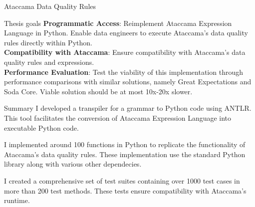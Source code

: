 \documentclass[portrait,a0paper,fontscale=0.25]{baposter}
\begin{document}
\begin{poster}
\begin{posterbox}[column=0, name=ata, below=background]{Ataccama Data Quality Rules}
	\end{posterbox}
	

\begin{posterbox}[column=0, name=goals, below=ata, headerColorOne=cyan!60, boxColorOne=cyan!20]{Thesis goals}
 \textbf{Programmatic Access}: Reimplement Ataccama Expression Language in Python. Enable data engineers to execute Ataccama’s data quality rules directly within Python. \\

 \textbf{Compatibility with Ataccama}: Ensure compatibility with Ataccama’s data quality rules and expressions. \\

 \textbf{Performance Evaluation}: Test the viability of this implementation through performance comparisons with similar solutions, namely Great Expectations and Soda Core. Viable solution should be at most 10x-20x slower. \\

\end{posterbox}


\begin{posterbox}[column=0, name=summary, below=goals]{Summary}
	I developed a transpiler for a grammar to Python code using ANTLR. This tool facilitates the conversion of Ataccama Expression Language into executable Python code.

	\vspace{0.5em}

    I implemented around 100 functions in Python to replicate the functionality of Ataccama's data quality rules. These implementation use the standard Python library along with various other dependecies.

	\vspace{0.5em}

    I created a comprehensive set of test suites containing over 1000 test cases in more than 200 test methods. These tests ensure compatibility with Ataccama's runtime.

\end{posterbox}


%
%


%
%
%


\end{poster}
\end{document}
